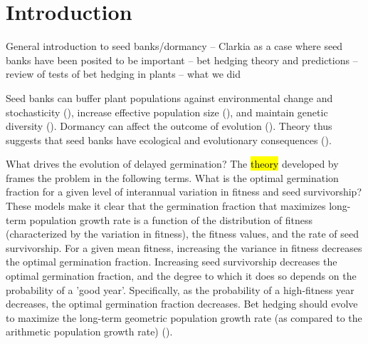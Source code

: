 \documentclass[12pt, oneside, titlepage]{article}   	%
\begin{document}
\section*{Introduction}

General introduction to seed banks/dormancy -- Clarkia as a case where seed banks have been posited to be important -- bet hedging theory and predictions -- review of tests of bet hedging in plants -- what we did

Seed banks can buffer plant populations against environmental change and stochasticity (\cite{eager2014,paniw2017}), increase effective population size (\cite{nunney2002,waples2006}), and maintain genetic diversity (\cite{mccue1998b}). Dormancy can affect the outcome of evolution (\cite{ritland1983,heinrich2018}). Theory thus suggests that seed banks have ecological and evolutionary consequences (\cite{evans2005}). 

What drives the evolution of delayed germination? The \hl{theory} developed by \cite{cohen1966} frames the problem in the following terms. What is the optimal germination fraction for a given level of interannual variation in fitness and seed survivorship? These models make it clear that the germination fraction that maximizes long-term population growth rate is a function of the distribution of fitness (characterized by the variation in fitness), the fitness values, and the rate of seed survivorship. For a given mean fitness, increasing the variance in fitness decreases the optimal germination fraction. Increasing seed survivorship decreases the optimal germination fraction, and the degree to which it does so depends on the probability of a 'good year'. Specifically, as the probability of a high-fitness year decreases, the optimal germination fraction decreases. Bet hedging should evolve to maximize the long-term geometric population growth rate (as compared to the arithmetic population growth rate) (\cite{cohen1966,cohen1968,ellner1985,ellner1985a}). 
\end{document}
